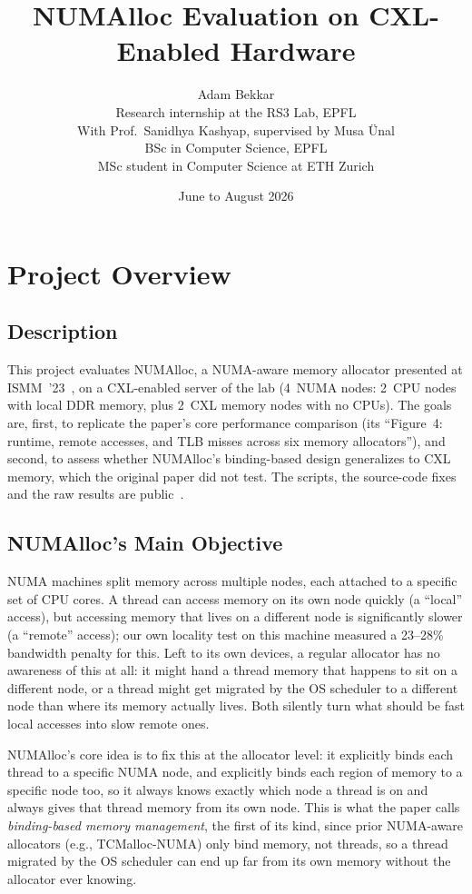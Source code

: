 \documentclass[11pt,a4paper]{article}
\title{\sffamily\bfseries NUMAlloc Evaluation on CXL-Enabled Hardware}
\author{Adam Bekkar\\[0.4em]
\normalsize Research internship at the RS3 Lab, EPFL\\
\normalsize With Prof.\ Sanidhya Kashyap, supervised by Musa \"Unal\\
\normalsize BSc in Computer Science, EPFL\\
\normalsize MSc student in Computer Science at ETH Zurich}
\date{June to August 2026}
\begin{document}
\maketitle

\section{Project Overview}

\subsection*{Description}

This project evaluates NUMAlloc, a NUMA-aware memory allocator presented at ISMM~'23~\cite{numalloc}, on a CXL-enabled server of the lab (4~NUMA nodes: 2~CPU nodes with local DDR memory, plus 2~CXL memory nodes with no CPUs). The goals are, first, to replicate the paper's core performance comparison (its ``Figure~4: runtime, remote accesses, and TLB misses across six memory allocators''), and second, to assess whether NUMAlloc's binding-based design generalizes to CXL memory, which the original paper did not test. The scripts, the source-code fixes and the raw results are public~\cite{repo}.

\subsection*{NUMAlloc's Main Objective}

NUMA machines split memory across multiple nodes, each attached to a specific set of CPU cores. A thread can access memory on its own node quickly (a ``local'' access), but accessing memory that lives on a different node is significantly slower (a ``remote'' access); our own locality test on this machine measured a 23--28\% bandwidth penalty for this. Left to its own devices, a regular allocator has no awareness of this at all: it might hand a thread memory that happens to sit on a different node, or a thread might get migrated by the OS scheduler to a different node than where its memory actually lives. Both silently turn what should be fast local accesses into slow remote ones.

NUMAlloc's core idea is to fix this at the allocator level: it explicitly binds each thread to a specific NUMA node, and explicitly binds each region of memory to a specific node too, so it always knows exactly which node a thread is on and always gives that thread memory from its own node. This is what the paper calls \emph{binding-based memory management}, the first of its kind, since prior NUMA-aware allocators (e.g., TCMalloc-NUMA) only bind memory, not threads, so a thread migrated by the OS scheduler can end up far from its own memory without the allocator ever knowing.
\end{document}
